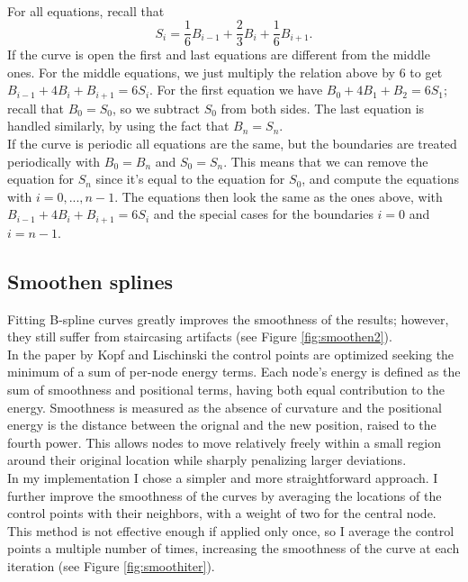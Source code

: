 \documentclass[]{usiinfbachelorproject}
\begin{document}
 \\
For all equations, recall that 
$$S_i = \frac{1}{6}B_{i-1} + \frac{2}{3}B_{i} + \frac{1}{6}B_{i+1}.$$
If the curve is open the first and last equations are different from the middle ones. For the middle equations, we just multiply the relation above by 6 to get $B_{i-1} + 4B_{i} + B_{i+1}=6S_i$. For the first equation we have $B_0+4B_1+B_2 = 6S_1$; recall that $B_0 = S_0$, so we subtract $S_0$ from both sides. The last equation is handled similarly, by using the fact that $B_n = S_n$.\\
If the curve is periodic all equations are the same, but the boundaries are treated periodically with $B_0 = B_n$ and $S_0 = S_n$. This means that we can remove the equation for $S_n$ since it's equal to the equation for $S_0$, and compute the equations with $i = 0, ...,n-1$. The equations then look the same as the ones above, with $B_{i-1} + 4B_{i} + B_{i+1}=6S_i$ and the special cases for the boundaries $i=0$ and $i=n-1$.

\clearpage


\subsection{Smoothen splines} \label{sec:smooth}

Fitting B-spline curves greatly improves the smoothness of the results; however, they still suffer from staircasing artifacts (see Figure \ref{fig:smoothen2}). \\ 
In the paper by Kopf and Lischinski \cite{Kopf2011} the control points are optimized seeking the minimum of a sum of per-node energy terms. Each node's energy is defined as the sum of smoothness and positional terms, having both equal contribution to the energy. Smoothness is measured as the absence of curvature and the positional energy is the distance between the orignal and the new position, raised to the fourth power. This allows nodes to move relatively freely within a small region around their original location while sharply penalizing larger deviations.\\
In my implementation I chose a simpler and more straightforward approach. I further improve the smoothness of the curves by averaging the locations of the control points with their neighbors, with a weight of two for the central node. This method is not effective enough if applied only once, so I average the control points a multiple number of times, increasing the smoothness of the curve at each iteration (see Figure \ref{fig:smoothiter}).
\end{document}
